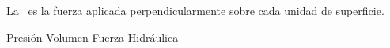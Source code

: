 
\question La \fillin\ es la fuerza aplicada perpendicularmente sobre cada
unidad de superficie.

  \begin{oneparchoices}
    \CorrectChoice Presión
    \choice Volumen
    \choice Fuerza
    \choice Hidráulica
  \end{oneparchoices}
  \answerline[A]
